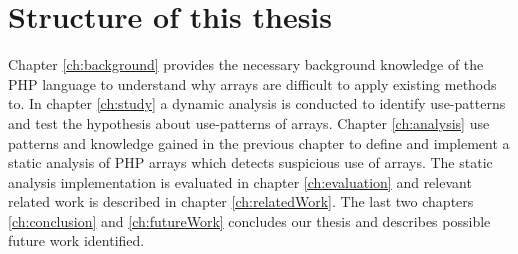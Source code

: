 
\section{Structure of this thesis}
Chapter \ref{ch:background} provides the necessary background knowledge of the PHP language to understand why arrays are difficult to apply existing methods to. In chapter \ref{ch:study} a dynamic analysis is conducted to identify use-patterns and test the hypothesis about use-patterns of arrays. Chapter \ref{ch:analysis} use patterns and knowledge gained in the previous chapter to define and implement a static analysis of PHP arrays which detects suspicious use of arrays. The static analysis implementation is evaluated in chapter \ref{ch:evaluation} and relevant related work is described in chapter \ref{ch:relatedWork}. The last two chapters \ref{ch:conclusion} and \ref{ch:futureWork} concludes our thesis and describes possible future work identified.

\begin{comment}

\section{Methodology}
To establish whether our three array types are accurate we dynamically analyse a range of popular open source PHP applications. We want to find operations that can be used to predict what type of array we are dealing with early in our static analysis.


\subsection{Metric}
\todo{In order to evaluate our results, we need to compare the performance of our tool against other similar tools wrt. the number of bugs found (real and false positives) and speed/scalability.}

\subsection{Benchmarks}

\subsection{Iterative process}

\end{comment}